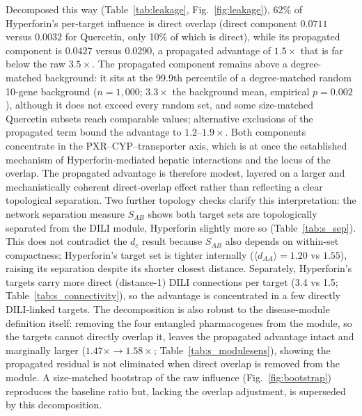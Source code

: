 Decomposed this way (Table~\ref{tab:leakage}, Fig.~\ref{fig:leakage}), 62\% of Hyperforin's per-target influence is direct overlap (direct component $0.0711$ versus $0.0032$ for Quercetin, only 10\% of which is direct), while its propagated component is $0.0427$ versus $0.0290$, a propagated advantage of $1.5\times$ that is far below the raw $3.5\times$. The propagated component remains above a degree-matched background: it sits at the 99.9th percentile of a degree-matched random 10-gene background ($n=1{,}000$; $3.3\times$ the background mean, empirical $p=0.002$), although it does not exceed every random set, and some size-matched Quercetin subsets reach comparable values; alternative exclusions of the propagated term bound the advantage to $1.2$--$1.9\times$. Both components concentrate in the PXR--CYP--transporter axis, which is at once the established mechanism of Hyperforin-mediated hepatic interactions and the locus of the overlap. The propagated advantage is therefore modest, layered on a larger and mechanistically coherent direct-overlap effect rather than reflecting a clear topological separation. Two further topology checks clarify this interpretation: the network separation measure $S_{AB}$ \citep{Menche2015} shows both target sets are topologically separated from the DILI module, Hyperforin slightly more so (Table~\ref{tab:s_sep}). This does not contradict the $d_c$ result because $S_{AB}$ also depends on within-set compactness; Hyperforin's target set is tighter internally ($\langle d_{AA}\rangle = 1.20$ vs $1.55$), raising its separation despite its shorter closest distance. Separately, Hyperforin's targets carry more direct (distance-1) DILI connections per target (3.4 vs 1.5; Table~\ref{tab:s_connectivity}), so the advantage is concentrated in a few directly DILI-linked targets. The decomposition is also robust to the disease-module definition itself: removing the four entangled pharmacogenes from the module, so the targets cannot directly overlap it, leaves the propagated advantage intact and marginally larger ($1.47\times \to 1.58\times$; Table~\ref{tab:s_modulesens}), showing the propagated residual is not eliminated when direct overlap is removed from the module. A size-matched bootstrap of the raw influence (Fig.~\ref{fig:bootstrap}) reproduces the baseline ratio but, lacking the overlap adjustment, is superseded by this decomposition.

